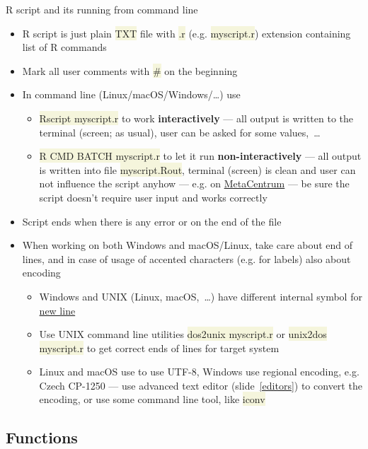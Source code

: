 \documentclass[compress, ucs, xelatex, 11pt, xcolor=svgnames, aspectratio=169,
	hyperref={
		bookmarks=true,
		unicode=true,
		colorlinks=true,
		pdftitle={Molecular data in R},
		plainpages=false,
		pdfauthor={Vojtech Zeisek},
		pdfsubject={Course about phylogeny and evolution in R},
		pdfcreator={XeLaTeX},
		pdfkeywords={R, evolution, phylogeny, molecular data},
		linkcolor=Crimson, %
		anchorcolor=Magenta, %
		citecolor=Magenta, %
		filecolor=Magenta, %
		menucolor=Magenta, %
		urlcolor=DodgerBlue, %
		pdftex},
	url={hyphens, lowtilde} %
	]{beamer}
\renewcommand{\texttt}[1]{\colorbox{Beige}{{\ttfamily #1}}}
\begin{document}
\begin{frame}[allowframebreaks]{R script and its running from command line}
	\begin{itemize}
		\item R script is just plain \texttt{TXT} file with \texttt{.r} (e.g. \texttt{myscript.r}) extension containing list of R commands
		\item Mark all user comments with \texttt{\#} on the beginning
		\item In command line (Linux/macOS/Windows/\ldots) use
		\begin{itemize}
			\item \texttt{Rscript myscript.r} to work \textbf{interactively} --- all output is written to the terminal (screen; as usual), user can be asked for some values,~\ldots
			\item \texttt{R CMD BATCH myscript.r} to let it run \textbf{non-interactively} --- all output is written into file \texttt{myscript.Rout}, terminal (screen) is clean and user can not influence the script anyhow --- e.g. on \href{https://www.metacentrum.cz/en/}{MetaCentrum} --- be sure the script doesn't require user input and works correctly
		\end{itemize}
		\item Script ends when there is any error or on the end of the file
		\item When working on both Windows and macOS/Linux, take care about end of lines, and in case of usage of accented characters (e.g. for labels) also about encoding
		\begin{itemize}
			\item Windows and UNIX (Linux, macOS,~\ldots) have different internal symbol for \href{https://en.wikipedia.org/wiki/Newline}{new line}
			\item Use UNIX command line utilities \texttt{dos2unix myscript.r} or \texttt{unix2dos myscript.r} to get correct ends of lines for target system
			\item Linux and macOS use to use UTF-8, Windows use regional encoding, e.g. Czech CP-1250 --- use advanced text editor (slide~\ref{editors}) to convert the encoding, or use some command line tool, like \texttt{iconv}
		\end{itemize}
	\end{itemize}
\end{frame}

\subsection{Functions}
\end{document}
